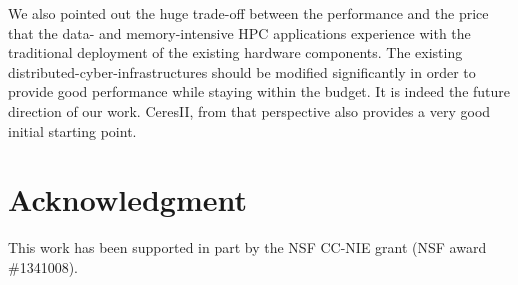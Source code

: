 \documentclass[conference]{IEEEtran}
\begin{document}
We also pointed out the huge trade-off between the performance and the price that the data- and memory-intensive HPC applications experience with the traditional deployment of the existing hardware components. The existing distributed-cyber-infrastructures should be modified significantly in order to provide good performance while staying within the budget. It is indeed the future direction of our work. CeresII, from that perspective also provides a very good initial starting point.



\section*{Acknowledgment}
This work has been supported in part by the NSF CC-NIE grant (NSF award
\#1341008).








%


\end{document}

